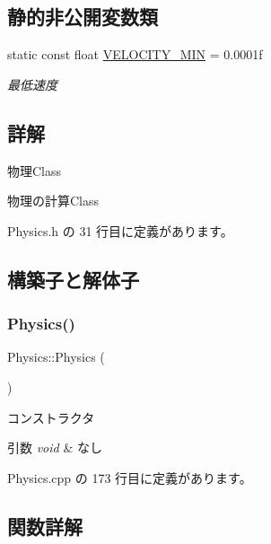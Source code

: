 \subsection*{静的非公開変数類}
\begin{DoxyCompactItemize}
\item 
static const float \mbox{\hyperlink{class_physics_a84ba24f3a5b31888a654c6750fb24faf}{V\+E\+L\+O\+C\+I\+T\+Y\+\_\+\+M\+IN}} = 0.\+0001f
\begin{DoxyCompactList}\small\item\em 最低速度 \end{DoxyCompactList}\end{DoxyCompactItemize}


\subsection{詳解}
物理\+Class 

物理の計算\+Class 

 Physics.\+h の 31 行目に定義があります。



\subsection{構築子と解体子}
\mbox{\label{class_physics_a4b2ebc0a344f04f48d227c72f0d0fbda}} 
\subsubsection{\texorpdfstring{Physics()}{Physics()}}
{\footnotesize\ttfamily Physics\+::\+Physics (\begin{DoxyParamCaption}{ }\end{DoxyParamCaption})}



コンストラクタ 


\begin{DoxyParams}{引数}
{\em void} & なし \\
\hline
\end{DoxyParams}


 Physics.\+cpp の 173 行目に定義があります。



\subsection{関数詳解}
\mbox{\label{class_physics_af88191e5605a97952caefd19319b05f9}} 
